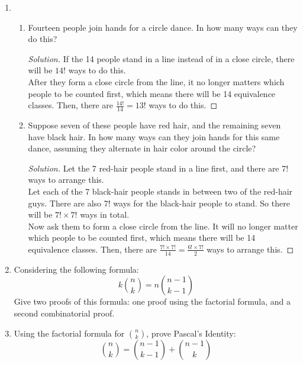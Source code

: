 \documentclass[12pt]{article}
\renewcommand\qedsymbol{$\blacksquare$}
\newenvironment{solution}
{\begin{proof}[Solution]\renewcommand\qedsymbol{$\square$}}
	{\end{proof}}
\begin{document}
\begin{enumerate}
		\item
		\begin{enumerate}[label=(\alph*)]
			\item Fourteen people join hands for a circle dance. In how many ways can they do this?
			\begin{solution}
				If the 14 people stand in a line instead of in a close circle, there will be $14!$ ways to do this. \\
				After they form a close circle from the line, it no longer matters which people to be counted first, which means there will be 14 equivalence classes. Then, there are $\frac{14!}{14} = 13!$ ways to do this.
			\end{solution}
			\clearpage
			\item Suppose seven of these people have red hair, and the remaining seven have black hair. In how many ways can they join hands for this same dance, assuming they alternate in hair color around the circle?
			\begin{solution}
				Let the 7 red-hair people stand in a line first, and there are 7! ways to arrange this.\\
				Let each of the 7 black-hair people stands in between two of the red-hair guys. There are also 7! ways for the black-hair people to stand. So there will be $7!\times 7!$ ways in total. \\
				Now ask them to form a close circle from the line. It will no longer matter which people to be counted first, which means there will be 14 equivalence classes. Then, there are $\frac{7!\times 7!}{14} = \frac{6!\times 7!}{2}$ ways to arrange this.
			\end{solution}
		\end{enumerate}
		
		\item Considering the following formula:
		\[k {n\choose k} = n {n-1\choose k-1} \]
		Give two proofs of this formula: one proof using the factorial formula, and a second combinatorial proof.
		
		\item Using the factorial formula for ${n\choose k}$, prove Pascal's Identity:
		\[{n\choose k} = {n-1\choose k-1} + {n-1\choose k}\]
		
	\end{enumerate}
\end{document}
